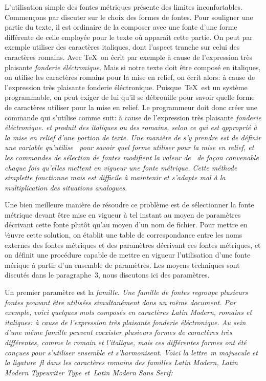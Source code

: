 L'utilisation simple des fontes métriques présente des limites
inconfortables. Commençons par discuter sur le choix des formes de
fontes. Pour souligner une partie du texte, il est ordinaire de la
composer avec une fonte d'une forme différente de celle employée pour
le texte où apparaît cette partie. On peut par exemple utiliser des
caractères italiques, dont l'aspect tranche sur celui des caractères
romains. Avec \TeX\ on écrit par exemple
\beginverbatim
à cause de l'expression très plaisante {\it fonderie éléctronique}.
\endverbatim
Mais si notre texte doit être composé en italiques, on utilise les
caractères romains pour la mise en relief, on écrit alors:
\beginverbatim
à cause de l'expression très plaisante {\rm fonderie éléctronique}.
\endverbatim
Puisque~\TeX\ est un système programmable, on peut exiger de lui qu'il
se débrouille pour savoir quelle forme de caractères utiliser pour la
mise en relief. Le programmeur doit donc créer une commande 
qui s'utilise comme suit:
\beginverbatim
à cause de l'expression très plaisante \em{fonderie éléctronique}.
\endverbatim
et produit des italiques ou des romains, selon ce qui est qpproprié à
la mise en relief d'une portion de texte. Une manière de s'y prendre
est de définir une variable  qu'utilise~ pour
savoir quel forme utiliser pour la mise en relief, et les commandes de
sélection de fontes modifient la valeur de~ de façon
convenable chaque fois qu'elles mettent en vigueur une fonte métrique.
Cette méthode simplette fonctionne mais est difficile à maintenir et
s'adapte mal à la multiplication des situations analogues.

Une bien meilleure manière de résoudre ce problème est de sélectionner
la fonte métrique devant être mise en vigueur à tel instant au moyen
de paramètres décrivant cette fonte plutôt qu'au moyen d'un nom de
fichier. Pour mettre en ½uvre cette solution, on établit une table de
correspondance entre les noms externes des fontes métriques et des
paramètres décrivant ces fontes métriques, et on définit une procédure
capable de mettre en vigueur l'utilisation d'une fonte mérique à
partir d'un ensemble de paramètres. Les moyens techniques sont
discutés dans le paragraphe~3, nous discutons ici des paramètres.

Un premier paramètre est la \em{famille}. Une famille de fontes
regroupe plusieurs fontes pouvant être utilisées simultanément dans un
même document. Par exemple, voici quelques mots composés en caractères
\em{Latin Modern,} romains et italiques:
\begindisplay
à cause de l'expression très plaisante \em{fonderie éléctronique}.
\enddisplay
\noindent
Au sein d'une même famille peuvent coexister plusieurs formes de
caractères très différentes, comme le romain et l'italique, mais ces
différentes formes ont été conçues pour s'utiliser ensemble et
s'harmonisent. Voici la lettre~\em{m} majuscule et la ligature~{fl}
dans les caractères romains des familles \em{Latin Modern}, \em{Latin
  Modern Typewriter Type} et~\em{Latin Modern Sans Serif}:

